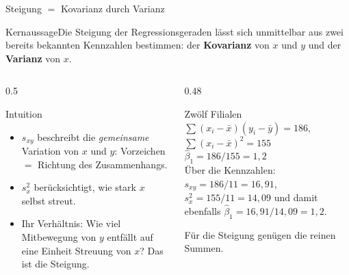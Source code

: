 \documentclass[aspectratio=169,11pt]{beamer}
\newcommand{\kernaussage}[1]{\begin{alertblock}{Kernaussage}#1\end{alertblock}}
\newcommand{\mindestzeilenabstand}{%
  \setlength{\lineskiplimit}{2pt}\setlength{\lineskip}{2pt}%
  \setlength{\normallineskiplimit}{2pt}\setlength{\normallineskip}{2pt}}
\begin{document}
\begin{frame}{Steigung $=$ Kovarianz durch Varianz}
  \kernaussage{Die Steigung der Regressionsgeraden lässt sich unmittelbar aus
    zwei bereits bekannten Kennzahlen bestimmen: der \textbf{Kovarianz} von $x$
    und $y$ und der \textbf{Varianz} von $x$.}

  \begin{columns}[T]
    \begin{column}{0.5\textwidth}
      \begin{block}{Intuition}
        \begin{itemize}
          \item $s_{xy}$ beschreibt die \emph{gemeinsame} Variation von $x$ und $y$:
                Vorzeichen $=$ Richtung des Zusammenhangs.
          \item $s_x^{2}$ berücksichtigt, wie stark $x$ selbst streut.
          \item Ihr Verhältnis: Wie viel Mitbewegung von $y$ entfällt auf
                eine Einheit Streuung von $x$? Das ist die Steigung.
        \end{itemize}
      \end{block}
    \end{column}
    \begin{column}{0.48\textwidth}
      \mindestzeilenabstand
      \begin{exampleblock}{Zwölf Filialen}
        $\sum (x_i-\bar{x})(y_i-\bar{y}) = 186$, \quad
        $\sum (x_i-\bar{x})^{2} = 155$ \\[3pt]
        $\hat{\beta}_1 = 186/155 = 1{,}2$ \\[3pt]
        Über die Kennzahlen: $s_{xy} = 186/11 = 16{,}91$,
        $s_x^{2} = 155/11 = 14{,}09$ und damit ebenfalls
        $\hat{\beta}_1 = 16{,}91/14{,}09 = 1{,}2$.
      \end{exampleblock}
      \footnotesize Für die Steigung genügen die reinen Summen.
    \end{column}
  \end{columns}
\end{frame}
\end{document}
